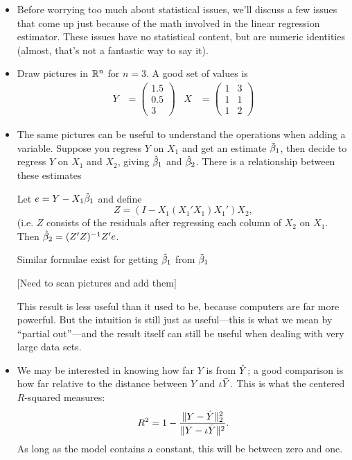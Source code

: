 \begin{itemize}[leftmargin=0pt]

\item Before worrying too much about statistical issues, we'll discuss
  a few issues that come up just because of the math involved in the
  linear regression estimator.  These issues have no statistical
  content, but are numeric identities (almost, that's not a fantastic
  way to say it).

\item Draw pictures in $\mathbb{R}^n$ for $n = 3$.  A good set of values is
  \begin{align*}
    Y &= \begin{pmatrix}1.5 \\ 0.5 \\ 3\end{pmatrix}&
    X &=
    \begin{pmatrix}
      1  &  3 \\
      1  &  1 \\
      1  &  2
    \end{pmatrix}
  \end{align*}

\item The same pictures can be useful to understand the operations
  when adding a variable.  Suppose you regress $Y$ on $X_1$ and get an
  estimate $\tilde{\beta}_1$, then decide to regress $Y$ on $X_1$ and $X_2$, giving
  $\hat{\beta}_1$ and $\hat{\beta}_2$.  There is a relationship between these estimates
  \begin{thm}
    Let $e = Y - X_1\tilde{\beta}_1$ and define
    \begin{equation*}
      Z = (I - X_1(X_1'X_1)X_1')X_2,
    \end{equation*}
    (i.e. $Z$ consists of the residuals after regressing each column
    of $X_2$ on $X_1$.  Then $\hat{\beta}_2 = (Z'Z)^{-1}Z'e$.
  \end{thm}
  Similar formulae exist for getting $\hat{\beta}_1$ from $\tilde{\beta}_1$

  [Need to scan pictures and add them]

  This result is less useful than it used to be, because computers are
  far more powerful.  But the intuition is still just as useful---this
  is what we mean by ``partial out''---and the result itself can still
  be useful when dealing with very large data sets.

\item We may be interested in knowing how far $Y$ is from $\hat{Y}$; a
  good comparison is how far relative to the distance between $Y$ and
  $\iota \bar{Y}$.  This is what the centered $R$-squared measures:
  \begin{equation*}
    R^2 = 1 - \frac{ \lVert Y - \hat{Y} \rVert_2^2}{\lVert Y - \iota \bar{Y} \rVert^2}.
  \end{equation*}
  As long as the model contains a constant, this will be between zero
  and one.


\end{itemize}
